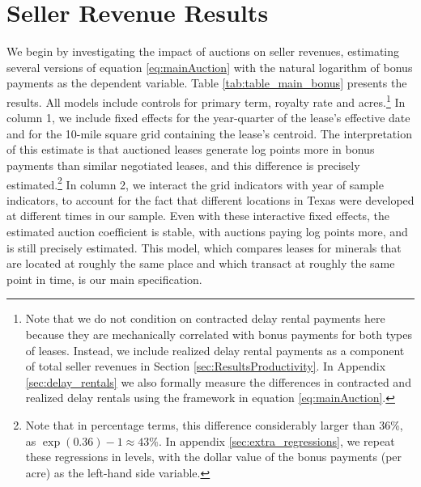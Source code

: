 \documentclass[12pt]{article}
\newcommand{\inputy}[1]{\unskip}
\begin{document}
\section{Seller Revenue Results \label{sec:ResultsBonus}}

We begin by investigating the impact of auctions on seller revenues, estimating several versions of equation \ref{eq:mainAuction} with the natural logarithm of bonus payments as the dependent variable. Table \ref{tab:table_main_bonus} presents the results. All models include controls for primary term, royalty rate and acres.\footnote{Note that we do not condition on contracted delay rental payments here because they are mechanically correlated with bonus payments for both types of leases. Instead, we include realized delay rental payments as a component of total seller revenues in Section \ref{sec:ResultsProductivity}.  In Appendix \ref{sec:delay_rentals} we also formally measure the differences in contracted and realized delay rentals using the framework in equation \ref{eq:mainAuction}.} In column 1, we include fixed effects for the year-quarter of the lease's effective date and for the 10-mile square grid containing the lease's centroid. The interpretation of this estimate is that auctioned leases generate \inputy{../output/estimates/Bonus_Grid10_log.tex} log points more in bonus payments than similar negotiated leases, and this difference is precisely estimated.\footnote{Note that in percentage terms, this difference considerably larger than 36\%, as $\exp(0.36) - 1 \approx 43\%$. In appendix \ref{sec:extra_regressions}, we repeat these regressions in levels, with the dollar value of the bonus payments (per acre) as the left-hand side variable.}  In column 2, we interact the grid indicators with year of sample indicators, to account for the fact that different locations in Texas were developed at different times in our sample. Even with these interactive fixed effects, the estimated auction coefficient is stable, with auctions paying \inputy{../output/estimates/Bonus_Grid10Yr_log.tex} log points more, and is still precisely estimated. This model, which compares leases for minerals that are located at roughly the same place and which transact at roughly the same point in time, is our main specification. 
\end{document}

